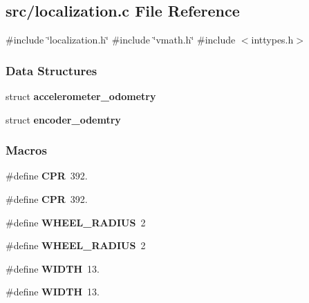 \subsection{src/localization.c File Reference}
\label{localization_8c}
{\ttfamily \#include \char`\"{}localization.\+h\char`\"{}}\newline
{\ttfamily \#include \char`\"{}vmath.\+h\char`\"{}}\newline
{\ttfamily \#include $<$inttypes.\+h$>$}\newline
\subsubsection*{Data Structures}
\begin{DoxyCompactItemize}
\item 
struct \textbf{ accelerometer\+\_\+odometry}
\item 
struct \textbf{ encoder\+\_\+odemtry}
\end{DoxyCompactItemize}
\subsubsection*{Macros}
\begin{DoxyCompactItemize}
\item 
\#define \textbf{ C\+PR}~392.
\item 
\#define \textbf{ C\+PR}~392.
\item 
\#define \textbf{ W\+H\+E\+E\+L\+\_\+\+R\+A\+D\+I\+US}~2
\item 
\#define \textbf{ W\+H\+E\+E\+L\+\_\+\+R\+A\+D\+I\+US}~2
\item 
\#define \textbf{ W\+I\+D\+TH}~13.
\item 
\#define \textbf{ W\+I\+D\+TH}~13.
\end{DoxyCompactItemize}
